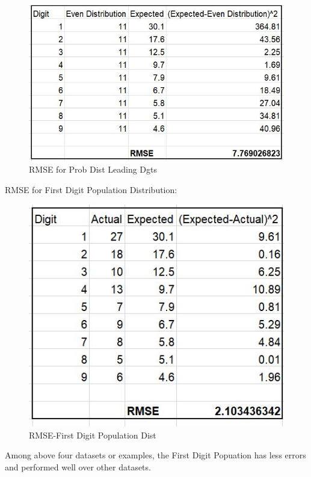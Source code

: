 \begin{figure}[!ht]
\centering\includegraphics[width=\columnwidth]{images/rmse_prob_dist.JPG}
  \caption{RMSE for Prob Dist Leading Dgts}\label{f:rmse-prob-dgt}
\end{figure}

RMSE for First Digit Population Distribution:
\begin{figure}[!ht]
\centering\includegraphics[width=\columnwidth]{images/rmse_f_pop.JPG}
  \caption{RMSE-First Digit Population Dist}\label{f:rmse-f-pop}
\end{figure}

Among above four datasets or examples, the First Digit Popuation
has less errors and performed well over other datasets.

